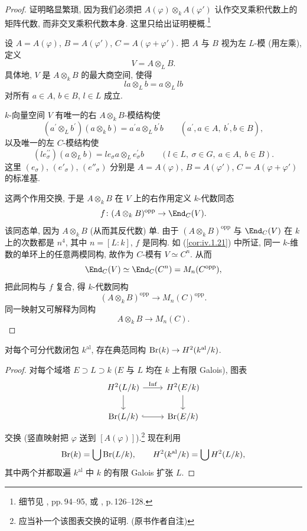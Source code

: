 \begin{proof}
证明略显繁琐, 因为我们必须把 $A(\varphi)\otimes_k A(\varphi')$ 认作交叉乘积代数上的矩阵代数, 而非交叉乘积代数本身. 这里只给出证明梗概.\footnote{细节见 \cite{Blanchard1972}, pp.\,94--95, 或 \cite{FarbDennis1993}, p.\,126--128.}

设 $A=A(\varphi)$, $B=A(\varphi')$, $C=A(\varphi+\varphi')$. 把 $A$ 与 $B$ 视为左 $L$-模 (用左乘), 定义
\[
V=A\otimes_{L}B.
\]
具体地, $V$ 是 $A\otimes_k B$ 的最大商空间, 使得
\[
la\otimes_{L}b=a\otimes_{L}lb
\]
对所有 $a\in A$, $b\in B$, $l\in L$ 成立.

$k$-向量空间 $V$ 有唯一的右 $A\otimes_k B$-模结构使
\[
(a^{\prime}\otimes_{L}b^{\prime})(a\otimes_{k}b)=a^{\prime}a\otimes_{L}b^{\prime}b\qquad(a^{\prime},a\in A,\ b^{\prime},b\in B),
\]
以及唯一的左 $C$-模结构使
\[
(le_{\sigma}^{\prime\prime})(a\otimes_{L}b)=le_{\sigma}a\otimes_{L}e_{\sigma}^{\prime}b\qquad(l\in L,\ \sigma\in G,\ a\in A,\ b\in B).
\]
这里 $(e_\sigma)$, $(e'_\sigma)$, $(e''_\sigma)$ 分别是 $A=A(\varphi)$, $B=A(\varphi')$, $C=A(\varphi+\varphi')$ 的标准基.

这两个作用交换, 于是 $A\otimes_k B$ 在 $V$ 上的右作用定义 $k$-代数同态
\[
f\colon(A\otimes_{k}B)^{\mathrm{opp}}\to\End_{C}(V).
\]
该同态单, 因为 $A\otimes_k B$ (从而其反代数) 单. 由于 $(A\otimes_k B)^{\mathrm{opp}}$ 与 $\End_C(V)$ 在 $k$ 上的次数都是 $n^4$, 其中 $n=[L:k]$, $f$ 是同构. 如 (\ref{cor:iv.1.21}) 中所证, 同一 $k$-维数的单环上的任意两模同构, 故作为 $C$-模有 $V\simeq C^n$. 从而
\[
\End_{C}(V)\simeq\End_{C}(C^{n})=M_{n}(C^{\mathrm{opp}}),
\]
把此同构与 $f$ 复合, 得 $k$-代数同构
\[
(A\otimes_{k}B)^{\mathrm{opp}}\to M_{n}(C)^{\mathrm{opp}}.
\]
同一映射又可解释为同构
\[
A\otimes_{k}B\to M_{n}(C).
\]
\end{proof}

\begin{corollary}\label{cor:iv.3.16}
对每个可分代数闭包 $k^{\mathrm{al}}$, 存在典范同构 $\operatorname{Br}(k)\to H^2(k^{\mathrm{al}}/k)$.
\end{corollary}

\begin{proof}
对每个域塔 $E\supset L\supset k$ ($E$ 与 $L$ 均在 $k$ 上有限 Galois), 图表
\[
\begin{tikzcd}
H^{2}(L/k)\ar[r,"\Inf"]\ar[d] & H^{2}(E/k)\ar[d]\\
\Br(L/k)\ar[r,hook] & \Br(E/k)
\end{tikzcd}
\]
交换 (竖直映射把 $\varphi$ 送到 $[A(\varphi)]$).\footnote{应当补一个该图表交换的证明. (原书作者自注)} 现在利用
\[
\operatorname{Br}(k)=\bigcup\operatorname{Br}(L/k),\qquad
H^{2}(k^{\mathrm{al}}/k)=\bigcup H^{2}(L/k),
\]
其中两个并都取遍 $k^{\mathrm{al}}$ 中 $k$ 的有限 Galois 扩张 $L$.
\end{proof}

